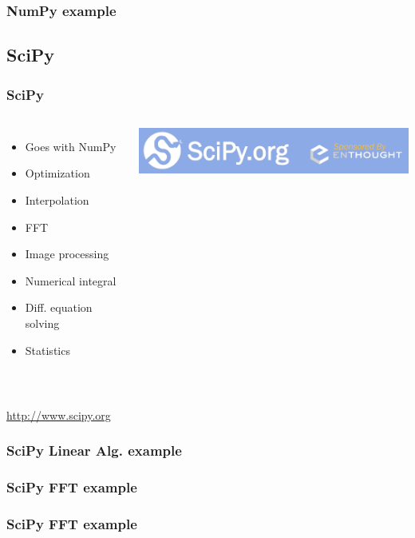 \documentclass[14pt]{beamer}
\begin{document}
\begin{frame}
\frametitle{NumPy example}

\end{frame}

\subsection{SciPy}
\begin{frame}
\frametitle{SciPy}
\begin{columns}
\begin{itemize}
\item Goes with NumPy
\item Optimization
\item Interpolation
\item FFT
\item Image processing
\item Numerical integral
\item Diff. equation solving
\item Statistics
\end{itemize}
\includegraphics[width=\textwidth]{Scipylogo.png}
\end{columns}
~\\
\url{http://www.scipy.org}
\end{frame}

\begin{frame}
\frametitle{SciPy Linear Alg. example}

\end{frame}

\begin{frame}
\frametitle{SciPy FFT example}

\end{frame}

\begin{frame}
\frametitle{SciPy FFT example}

\end{frame}
\end{document}
